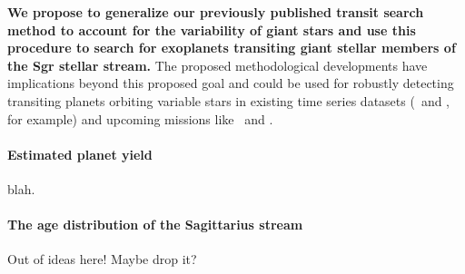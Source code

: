 \documentclass[letterpaper,12pt,preprint]{hack_aastex}
\begin{document}
{\bf We propose to generalize our previously published transit search method
\citep{Foreman-Mackey:2015} to account for the variability of giant stars and
use this procedure to search for exoplanets transiting giant stellar members
of the Sgr stellar stream.} The proposed methodological developments have
implications beyond this proposed goal and could be used for robustly
detecting transiting planets orbiting variable stars in existing time series
datasets (\KT\ and \kepler, for example) and upcoming missions like \TESS\ and
\PLATO.

\paragraph{Estimated planet yield} blah.

\paragraph{The age distribution of the Sagittarius stream}

Out of ideas here! Maybe drop it?
\end{document}
